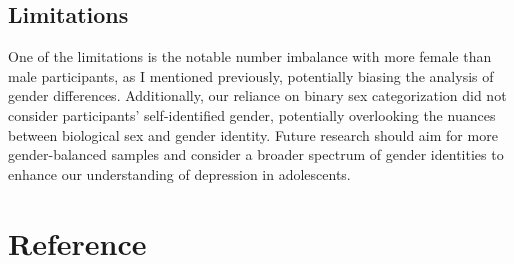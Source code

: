 \documentclass[
  man,floatsintext]{apa6}
\begin{document}
\hypertarget{limitations}{%
\subsection{Limitations}\label{limitations}}

One of the limitations is the notable number imbalance with more female than male participants, as I mentioned previously, potentially biasing the analysis of gender differences. Additionally, our reliance on binary sex categorization did not consider participants' self-identified gender, potentially overlooking the nuances between biological sex and gender identity. Future research should aim for more gender-balanced samples and consider a broader spectrum of gender identities to enhance our understanding of depression in adolescents.

\newpage

\hypertarget{reference}{%
\section{Reference}\label{reference}}

\hypertarget{ref}{}
\end{document}
